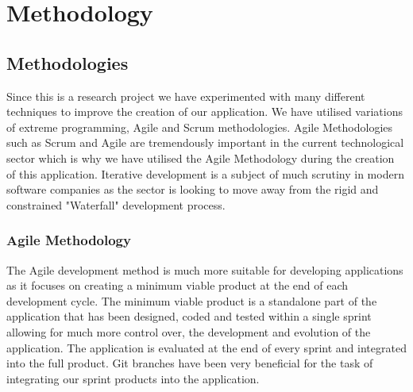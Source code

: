 \chapter{Methodology}

\section{Methodologies}

  Since this is a research project we have experimented with many different techniques to improve the creation of our application. We have utilised variations of extreme programming,
  Agile and Scrum methodologies.
  Agile Methodologies such as Scrum and Agile are tremendously important in the current technological sector which is why we have utilised the Agile Methodology during the creation of this application\cite{agile}.
  Iterative development is a subject of much scrutiny in modern software companies as the sector is looking to move away from the rigid and constrained "Waterfall" development process\cite{agilewaterfall}.


  \subsection{Agile Methodology}
  The Agile development method is much more suitable for developing applications as it focuses on creating a minimum viable product at the end of each development cycle.
  The minimum viable product is a standalone part of the application that has been designed, coded and tested within a single sprint allowing for much more control over,
  the development and evolution of the application. The application is evaluated at the end of every sprint and integrated into the full product.
  Git branches have been very beneficial for the task of integrating our sprint products into the application.

